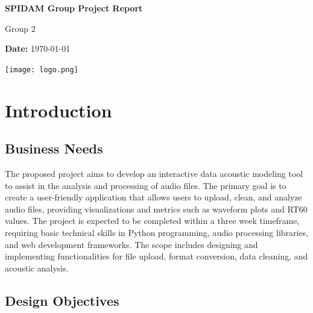 \documentclass[11pt]{article}
\begin{document}
\singlespacing
\raggedbottom
\setlength{\parskip}{1em}
\setlength{\parindent}{0pt}

\begin{titlepage}
    \centering
    \vspace*{1in}
    \Huge
    \textbf{SPIDAM Group Project Report}
    
    \vspace{0.5in}
    \Large
    Group 2
    
    \vfill
    \Large
    \textbf{Date:} \today
    
    \vspace{0.5in}
    \texttt{[image: logo.png]}
\end{titlepage}

\newpage

\tableofcontents
\newpage

\section{Introduction}

\subsection{Business Needs}

The proposed project aims to develop an interactive data acoustic 
modeling tool to assist in the analysis and processing of audio files. 
The primary goal is to create a user-friendly application that allows users to upload, 
clean, and analyze audio files, providing visualizations and metrics such as waveform 
plots and RT60 values. The project is expected to be completed within a three week timeframe, 
requiring basic technical skills in Python programming, audio processing libraries, 
and web development frameworks. The scope includes designing and implementing functionalities 
for file upload, format conversion, data cleaning, and acoustic analysis.

\subsection{Design Objectives}
\end{document}

